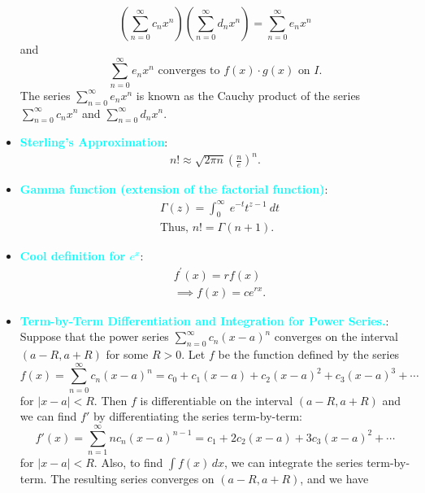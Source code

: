 \documentclass{report}
\begin{document}
\begin{itemize}
\[                    \left( \sum_{n=0}^{\infty} c_n x^n \right) \left( \sum_{n=0}^{\infty} d_n x^n \right) = \sum_{n=0}^{\infty} e_n x^n
                \]
                and
                \[
                    \sum_{n=0}^{\infty} e_n x^n \text{ converges to } f(x) \cdot g(x) \text{ on } I.
                \]
                The series \(\sum_{n=0}^{\infty} e_n x^n\) is known as the Cauchy product of the series \(\sum_{n=0}^{\infty} c_n x^n\) and \(\sum_{n=0}^{\infty} d_n x^n\).
            \item \textbf{\textcolor{cyan}{Sterling's Approximation}}:
                \begin{align*}
                    n! \approx \sqrt{2\pi n}\left(\frac{n}{e}\right)^{n}
                .\end{align*}
            \item \textbf{\textcolor{cyan}{Gamma function (extension of the factorial function)}}:
                \begin{align*}
                     &\Gamma(z) = \int_{0}^{\infty}\ e^{-t}t^{z-1}\ dt \\
                     &\text{Thus, } n! = \Gamma(n+1)
                 .\end{align*}
             \item \textbf{\textcolor{cyan}{Cool definition for $e^{x}$}}:
                 \begin{align*}
                    &f^{\prime}(x) = rf(x) \\
                    &\implies f(x) = ce^{rx}
                .\end{align*}
            \item \textbf{\textcolor{cyan}{Term-by-Term Differentiation and Integration for Power Series.}}:
                Suppose that the power series $\sum_{n=0}^{\infty} c_n (x - a)^n$ converges on the interval $(a - R, a + R)$ for some $R > 0$. Let $f$ be the function defined by the series
                \[
                    f(x) = \sum_{n=0}^{\infty} c_n (x - a)^n = c_0 + c_1(x - a) + c_2(x - a)^2 + c_3(x - a)^3 + \cdots
                \]
                for $|x - a| < R$. Then $f$ is differentiable on the interval $(a - R, a + R)$ and we can find $f'$ by differentiating the series term-by-term:
                \[
                    f'(x) = \sum_{n=1}^{\infty} n c_n (x - a)^{n-1} = c_1 + 2c_2(x - a) + 3c_3(x - a)^2 + \cdots
                \]
                for $|x - a| < R$. Also, to find $\int f(x) \, dx$, we can integrate the series term-by-term. The resulting series converges on $(a - R, a + R)$, and we have

\end{itemize}
\end{document}

